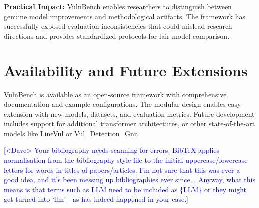 \documentclass[letterpaper]{article}
\newcommand{\note}[2][red]{\textcolor{#1}{#2}}
\newcommand{\notedme}[1]{\note[blue]{[<Dave> #1]}}
\begin{document}
\textbf{Practical Impact:} VulnBench enables researchers to distinguish between genuine model improvements and methodological artifacts. The framework has successfully exposed evaluation inconsistencies that could mislead research directions and provides standardized protocols for fair model comparison.

\section{Availability and Future Extensions}

VulnBench is available as an open-source framework with comprehensive documentation and example configurations. The modular design enables easy extension with new models, datasets, and evaluation metrics. Future development includes support for additional transformer architectures, or other state-of-the-art models like LineVul or Vul\_Detection\_Gnn.

\notedme{Your bibliography needs scanning for errors: BibTeX applies normalisation from the bibliography style file to the initial uppercase/lowercase letters for words in titles of papers/articles. I'm not sure that this was ever a good idea, and it's been messing up bibliographies ever since... Anyway, what this means is that terms such as LLM need to be included as \{LLM\} or they might get turned into `llm'---as has indeed happened in your case.}



\end{document}
